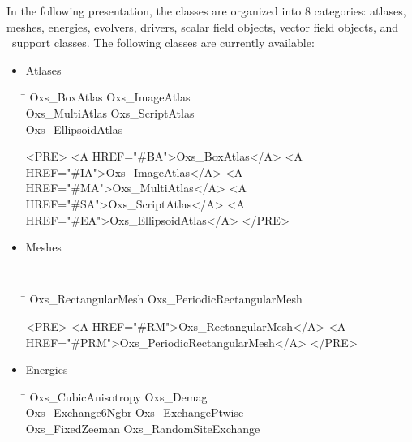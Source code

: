 In the following presentation, the  classes are organized
into 8 categories: atlases, meshes, energies, evolvers, drivers, scalar
field objects, vector field objects, and \MIF\ support classes.  The
following  classes are currently available:
\begin{itemize}
\newlength{\tabcolwidth}
\settowidth{\tabcolwidth}{\tt Oxs\_AffineTransformVectorField}
\addtolength{\tabcolwidth}{3em}
\setlength{\parskip}{0pt}
\setlength{\topsep}{0pt}
\item Atlases
   {\tt\begin{tabbing}
   \hspace*{\tabcolwidth}\=\kill
      Oxs\_BoxAtlas    \>  Oxs\_ImageAtlas \\
      Oxs\_MultiAtlas  \>  Oxs\_ScriptAtlas \\
      Oxs\_EllipsoidAtlas
   \end{tabbing}}
  \begin{rawhtml}
<PRE>
   <A HREF="#BA">Oxs_BoxAtlas</A>                    <A HREF="#IA">Oxs_ImageAtlas</A>
   <A HREF="#MA">Oxs_MultiAtlas</A>                  <A HREF="#SA">Oxs_ScriptAtlas</A>
   <A HREF="#EA">Oxs_EllipsoidAtlas</A>
</PRE>
  \end{rawhtml}
\item Meshes
  {\samepage\tt
   \begin{tabbing}
   \hspace*{\tabcolwidth}\=\kill
      Oxs\_RectangularMesh     \>    Oxs\_PeriodicRectangularMesh
   \end{tabbing}}
  \begin{rawhtml}
<PRE>
   <A HREF="#RM">Oxs_RectangularMesh</A>            <A HREF="#PRM">Oxs_PeriodicRectangularMesh</A>
</PRE>
  \end{rawhtml}
\item Energies
   {\tt\begin{tabbing}
   \hspace*{\tabcolwidth}\=\kill
      Oxs\_CubicAnisotropy     \>    Oxs\_Demag              \\
      Oxs\_Exchange6Ngbr       \>    Oxs\_ExchangePtwise     \\
      Oxs\_FixedZeeman         \>    Oxs\_RandomSiteExchange \\

\end{tabbing}}
\end{itemize}
